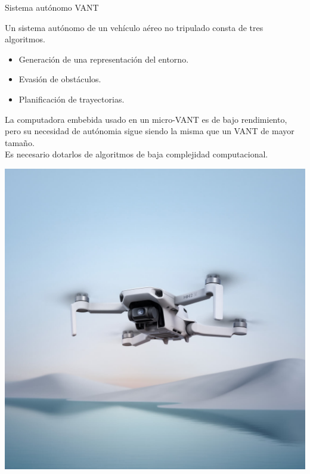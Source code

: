 \documentclass[
  24pt, %
  aspectratio=169, %
]{beamer}
\begin{document}
\begin{frame}{Sistema autónomo VANT}
  \begin{minipage}{0.47\textwidth}
    
    \small Un sistema autónomo de un vehículo aéreo no tripulado consta de tres algoritmos.
    
    \begin{itemize}
    \item Generación de una representación del entorno.
    \item Evasión de obstáculos.
    \item Planificación de trayectorias.
    \end{itemize}

    \small La computadora embebida usado en un micro-VANT es de bajo rendimiento, pero su necesidad de autónomia sigue siendo la misma que un VANT de mayor tamaño.\\
    Es necesario dotarlos de algoritmos de baja complejidad computacional.
    
  \end{minipage}
  \hspace{0.2cm}
  \begin{minipage}{0.5\textwidth}
    \includegraphics[width=\textwidth]{ultra.jpg}
  \end{minipage}
\end{frame}
\end{document}
